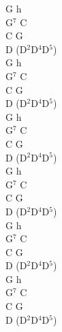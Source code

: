 \documentclass[a5paper, 10pt]{book}
\begin{document}
\begin{minipage}[t]{0.16\textwidth}
  G h\\
  G$^7$ C\\
  C G\\
  D (D$^2$D$^4$D$^5$)\\

  G h\\
  G$^7$ C\\
  C G\\
  D (D$^2$D$^4$D$^5$)\\

  G h\\
  G$^7$ C\\
  C G\\
  D (D$^2$D$^4$D$^5$)\\

  G h\\
  G$^7$ C\\
  C G\\
  D (D$^2$D$^4$D$^5$)\\

  G h\\
  G$^7$ C\\
  C G\\
  D (D$^2$D$^4$D$^5$)\\

  G h\\
  G$^7$ C\\
  C G\\
  D (D$^2$D$^4$D$^5$)\\
\end{minipage}

\newpage
\end{document}
